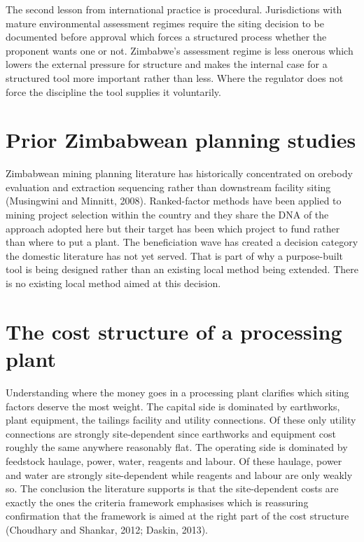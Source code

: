 \documentclass[12pt,a4paper]{report}
\begin{document}
The second lesson from international practice is procedural.
Jurisdictions with mature environmental assessment regimes require the
siting decision to be documented before approval which forces a
structured process whether the proponent wants one or not. Zimbabwe's
assessment regime is less onerous which lowers the external pressure
for structure and makes the internal case for a structured tool more
important rather than less. Where the regulator does not force the
discipline the tool supplies it voluntarily.

\section{Prior Zimbabwean planning studies}
Zimbabwean mining planning literature has historically concentrated on
orebody evaluation and extraction sequencing rather than downstream
facility siting (Musingwini and Minnitt, 2008). Ranked-factor methods
have been applied to mining project selection within the country and
they share the DNA of the approach adopted here but their target has
been which project to fund rather than where to put a plant. The
beneficiation wave has created a decision category the domestic
literature has not yet served. That is part of why a purpose-built
tool is being designed rather than an existing local method being
extended. There is no existing local method aimed at this decision.

\section{The cost structure of a processing plant}
Understanding where the money goes in a processing plant clarifies
which siting factors deserve the most weight. The capital side is
dominated by earthworks, plant equipment, the tailings facility and
utility connections. Of these only utility connections are strongly
site-dependent since earthworks and equipment cost roughly the same
anywhere reasonably flat. The operating side is dominated by feedstock
haulage, power, water, reagents and labour. Of these haulage, power
and water are strongly site-dependent while reagents and labour are
only weakly so. The conclusion the literature supports is that the
site-dependent costs are exactly the ones the criteria framework
emphasises which is reassuring confirmation that the framework is
aimed at the right part of the cost structure (Choudhary and Shankar,
2012; Daskin, 2013).
\end{document}
